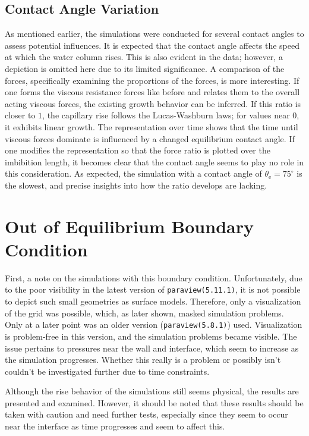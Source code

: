 \subsection{Contact Angle Variation}
As mentioned earlier, the simulations were conducted for several contact angles to assess potential influences. It is expected that the contact angle affects the speed at which the water column rises. This is also evident in the data; however, a depiction is omitted here due to its limited significance. A comparison of the forces, specifically examining the proportions of the forces, is more interesting. If one forms the viscous resistance forces like before and relates them to the overall acting viscous forces, the existing growth behavior can be inferred. If this ratio is closer to $1$, the capillary rise follows the Lucas-Washburn laws; for values near $0$, it exhibits linear growth. The representation over time shows that the time until viscous forces dominate is influenced by a changed equilibrium contact angle. If one modifies the representation so that the force ratio is plotted over the imbibition length, it becomes clear that the contact angle seems to play no role in this consideration. As expected, the simulation with a contact angle of $\theta_{\mathrm{e}}=75^{\circ}$ is the slowest, and precise insights into how the ratio develops are lacking.

\section{Out of Equilibrium Boundary Condition}
\label{sec: outOfEquilibriumBoundaryCondition}
First, a note on the simulations with this boundary condition. Unfortunately, due to the poor visibility in the latest version of \texttt{paraview(5.11.1)}, it is not possible to depict such small geometries as surface models. Therefore, only a visualization of the grid was possible, which, as later shown, masked simulation problems. Only at a later point was an older version (\texttt{paraview(5.8.1)}) used. Visualization is problem-free in this version, and the simulation problems became visible. The issue pertains to pressures near the wall and interface, which seem to increase as the simulation progresses. Whether this really is a problem or possibly isn't couldn't be investigated further due to time constraints.

Although the rise behavior of the simulations still seems physical, the results are presented and examined. However, it should be noted that these results should be taken with caution and need further tests, especially since they seem to occur near the interface as time progresses and seem to affect this. 

